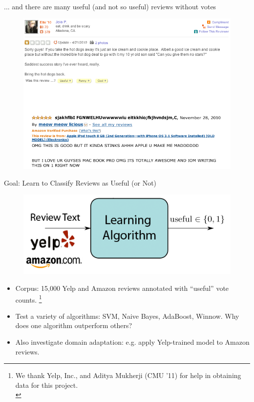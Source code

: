 \documentclass{beamer}
\begin{document}
\begin{frame}{... and there are many useful (and not so useful) reviews without votes}
\begin{figure}[h]
  \centering
  \includegraphics[scale=.4]{review_unvoted}
  \label{fig:unvoted}
\end{figure}
\end{frame}

\begin{frame}{Goal: Learn to Classify Reviews as Useful (or Not)}
\begin{figure}[h]
  \centering
  \includegraphics[scale=.4]{learning_summary}
  \label{fig:summary}
\end{figure}
\begin{itemize}
\item Corpus: 15,000 Yelp and Amazon reviews annotated with ``useful'' vote counts. \footnote{{\tiny We thank Yelp, Inc., and Aditya Mukherji (CMU '11) for help in obtaining data for this project.}\\}
\item Test a variety of algorithms: SVM, Naive Bayes, AdaBoost, Winnow.  Why does one algorithm outperform others?
\item Also investigate domain adaptation: e.g. apply Yelp-trained model to Amazon reviews.
\end{itemize}
\end{frame}
\end{document}
